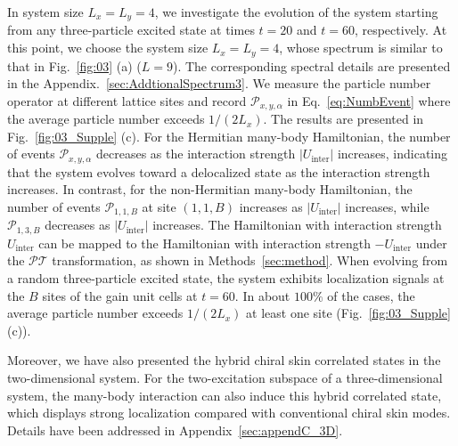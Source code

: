 \documentclass[longbibliography, aps, prx, amsmath, amssymb, amsfonts, twocolumn,superscriptaddress, footinbib]{revtex4-1}
\begin{document}
	In system size $L_x = L_y = 4$, we investigate the evolution of the system starting from any three-particle excited state at times $t = 20$ and $t = 60$, respectively. 
	At this point, we choose the system size $L_x=L_y=4$, whose spectrum is similar to that in Fig.~\ref{fig:03} (a) ($L=9$). The corresponding spectral details are presented in the Appendix.~\ref{sec:AddtionalSpectrum3}.
	We measure the particle number operator at different lattice sites and record $\mathcal{P}_{x,y,\alpha}$ in Eq.~\eqref{eq:NumbEvent} where the average particle number exceeds $1/(2L_x)$. The results are presented in Fig.~\ref{fig:03_Supple} (c).
	For the Hermitian many-body Hamiltonian, the number of events $\mathcal{P}_{x,y,\alpha}$ decreases as the interaction strength $\vert U_{\text{inter}}\vert $ increases, indicating that the system evolves toward a delocalized state as the interaction strength increases. 
	In contrast, for the non-Hermitian many-body Hamiltonian, the number of events $\mathcal{P}_{1,1,B}$ at site $(1,1,B)$ increases as $\vert U_{\text{inter}}\vert$ increases, while $\mathcal{P}_{1,3,B}$ decreases as $\vert U_{\text{inter}}\vert$ increases. 
	The Hamiltonian with interaction strength $U_{\text{inter}}$ can be mapped to the Hamiltonian with interaction strength $-U_{\text{inter}}$ under the $\mathcal{PT}$ transformation, as shown in Methods~\ref{sec:method}.
	When evolving from a random three-particle excited state, the system exhibits localization signals at the $B$ sites of the gain unit cells at $t=60$.
	In about $100\%$ of the cases, the average particle number exceeds $1/(2L_x)$ at least one site (Fig.~\ref{fig:03_Supple}(c)).

	Moreover, we have also presented the hybrid chiral skin correlated states in the two-dimensional system. For the two-excitation subspace of a three-dimensional system, the many-body interaction can also induce this hybrid correlated state, which displays strong localization compared with conventional chiral skin modes. Details have been addressed in Appendix~\ref{sec:appendC_3D}.
\end{document}
